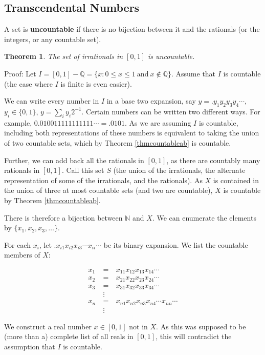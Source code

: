 \documentclass[12pt,letterpaper]{report}
\newcommand\bea{\begin{eqnarray}}
\newcommand\eea{\end{eqnarray}}
\newcommand{\Q}{\mathbb{Q}}
\newcommand{\N}{\mathbb{N}}
\newtheorem{thm}{Theorem}[section]
\begin{document}
\subsection{Transcendental Numbers}

A set is \textbf{uncountable} if there is no bijection between it
and the rationals (or the integers, or any countable set).

\begin{thm} The set of irrationals in $[0,1]$ is uncountable.
\end{thm}

Proof: Let $I = [0,1] - \Q = \{x: 0 \le x \le 1 \ \mbox{and} \ x
\not\in \Q\}$. Assume that $I$ is countable (the case where $I$ is
finite is even easier).

We can write every number in $I$ in a base two expansion, say $y =
.y_1y_2y_3y_4\cdots$, $y_i \in \{0,1\}$, $y = \sum_i y_i 2^{-1}$.
Certain numbers can be written two different ways. For example,
$0.010011111111111\cdots = .0101$. As we are assuming $I$ is
countable, including both representations of these numbers is
equivalent to taking the union of two countable sets, which by
Theorem \ref{thmcountableab} is countable.

Further, we can add back all the rationals in $[0,1]$, as there
are countably many rationals in $[0,1]$. Call this set $S$ (the
union of the irrationals, the alternate representation of some of
the irrationals, and the rationals). As $X$ is contained in the
union of three at most countable sets (and two are countable), $X$
is countable by Theorem \ref{thmcountableab}.

There is therefore a bijection between $\N$ and $X$. We can
enumerate the elements by $\{x_1, x_2, x_3, \dots \}$.

For each $x_i$, let $.x_{i1}x_{i2}x_{i3}\cdots x_{ii} \cdots $ be
its binary expansion. We list the countable members of $X$:

\bea x_1 & \ = \ & x_{11}x_{12}x_{13} x_{14} \cdots \nonumber\\
x_2 & \ = \ & x_{21}x_{22}x_{23} x_{24} \cdots \nonumber\\ x_3 & \
= \ & x_{31}x_{32}x_{33} x_{34} \cdots \nonumber\\ & \ \vdots \ &
\nonumber\\ x_n & \ = \ & x_{n1}x_{n2}x_{n3} x_{n4} \cdots x_{nn}
\cdots \nonumber\\ & \ \vdots \ & \eea

We construct a real number $x \in [0,1]$ not in $X$. As this was
supposed to be (more than a) complete list of all reals in
$[0,1]$, this will contradict the assumption that $I$ is
countable.
\end{document}

